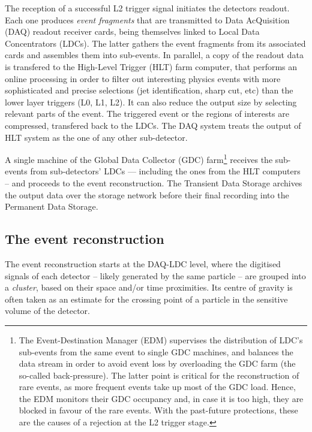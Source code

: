 The reception of a successful L2 trigger signal initiates the detectors readout. Each one produces \textit{event fragments} that are transmitted to Data AcQuisition (DAQ) readout receiver cards, being themselves linked to Local Data Concentrators (LDCs). The latter gathers the event fragments from its associated cards and assembles them into sub-events. In parallel, a copy of the readout data is transfered to the High-Level Trigger (HLT) farm computer, that performs an online processing in order to filter out interesting physics events with more sophisticated and precise selections (jet identification, sharp \pT cut, etc) than the lower layer triggers (L0, L1, L2). It can also reduce the output size by selecting relevant parts of the event. The triggered event or the regions of interests are compressed, transfered back to the LDCs. The DAQ system treats the output of HLT system as the one of any other sub-detector.

A single machine of the Global Data Collector (GDC) farm\footnote{The Event-Destination Manager (EDM) supervises the distribution of LDC's sub-events from the same event to single GDC machines, and balances the data stream in order to avoid event loss by overloading the GDC farm (the so-called back-pressure). The latter point is critical for the reconstruction of rare events, as more frequent events take up most of the GDC load. Hence, the EDM monitors their GDC occupancy and, in case it is too high, they are blocked in favour of the rare events. With the past-future protections, these are the causes of a rejection at the L2 trigger stage.} receives the sub-events from sub-detectors' LDCs --- including the ones from the HLT computers -- and proceeds to the event reconstruction. The Transient Data Storage archives the output data over the storage network before their final recording into the Permanent Data Storage.


\subsection{The event reconstruction}
\label{subsec:EventReco}

The event reconstruction starts at the DAQ-LDC level, where the digitised signals of each detector -- likely generated by the same particle -- are grouped into a \textit{cluster}, based on their space and/or time proximities. Its centre of gravity is often taken as an estimate for the crossing point of a particle in the sensitive volume of the detector.


